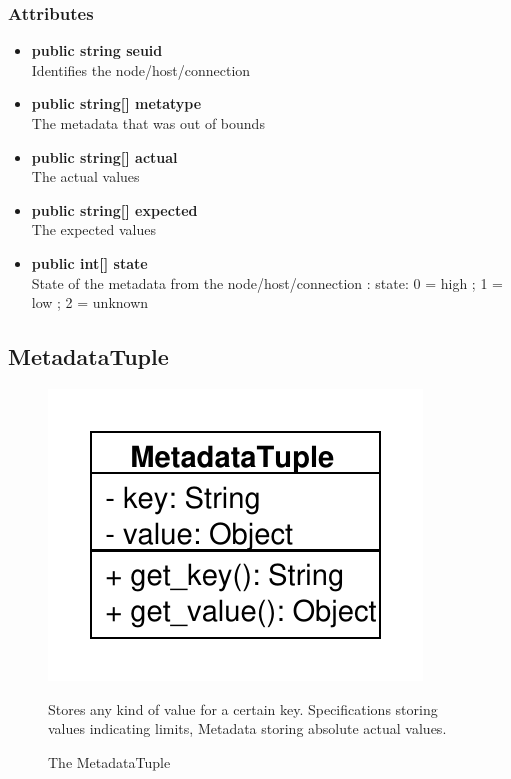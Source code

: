\subsubsection{Attributes}
\begin{itemize}
	\item \textbf{public string seuid}\\
	Identifies the node/host/connection
	\item \textbf{public string[] metatype}\\
	The metadata that was out of bounds
	\item \textbf{public string[] actual}\\
	The actual values
	\item \textbf{public string[] expected}\\
	The expected values
	\item \textbf{public int[] state}\\
	State of the metadata from the node/host/connection : state: { 0 = high ; 1 = low ; 2 = unknown}
\end{itemize}


\subsection{MetadataTuple}
\begin{figure}[htbp]
	\begin{minipage}[t]{7cm}
		\vspace{0pt}
		\centering
		\includegraphics[scale=0.6]{./diagram_pictures/MetadataTuple.pdf}
		\caption{The MetadataTuple}
	\end{minipage}
	\hfill
	\begin{minipage}[t]{8cm}
		\vspace{10pt}
		Stores any kind of value for a certain key. Specifications storing values indicating limits, Metadata storing absolute actual values.
	\end{minipage}
\end{figure}

